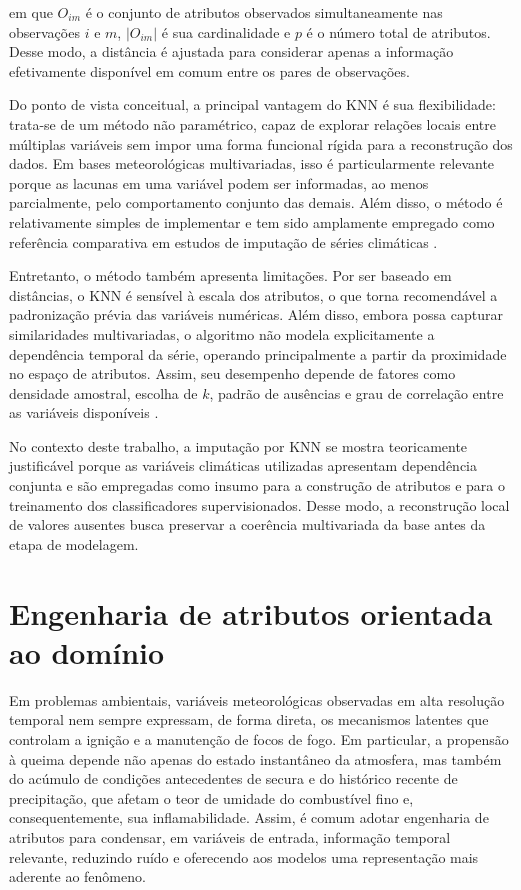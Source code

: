 em que $O_{im}$ é o conjunto de atributos observados simultaneamente nas observações $i$ e $m$, $|O_{im}|$ é sua cardinalidade e $p$ é o número total de atributos. Desse modo, a distância é ajustada para considerar apenas a informação efetivamente disponível em comum entre os pares de observações.

Do ponto de vista conceitual, a principal vantagem do KNN é sua flexibilidade: trata-se de um método não paramétrico, capaz de explorar relações locais entre múltiplas variáveis sem impor uma forma funcional rígida para a reconstrução dos dados. Em bases meteorológicas multivariadas, isso é particularmente relevante porque as lacunas em uma variável podem ser informadas, ao menos parcialmente, pelo comportamento conjunto das demais. Além disso, o método é relativamente simples de implementar e tem sido amplamente empregado como referência comparativa em estudos de imputação de séries climáticas \cite{alejosanchez2025review,troyanskaya2001missing}.

Entretanto, o método também apresenta limitações. Por ser baseado em distâncias, o KNN é sensível à escala dos atributos, o que torna recomendável a padronização prévia das variáveis numéricas. Além disso, embora possa capturar similaridades multivariadas, o algoritmo não modela explicitamente a dependência temporal da série, operando principalmente a partir da proximidade no espaço de atributos. Assim, seu desempenho depende de fatores como densidade amostral, escolha de $k$, padrão de ausências e grau de correlação entre as variáveis disponíveis \cite{ribeiro2021imputation,alejosanchez2025review}.

No contexto deste trabalho, a imputação por KNN se mostra teoricamente justificável porque as variáveis climáticas utilizadas apresentam dependência conjunta e são empregadas como insumo para a construção de atributos e para o treinamento dos classificadores supervisionados. Desse modo, a reconstrução local de valores ausentes busca preservar a coerência multivariada da base antes da etapa de modelagem.

\section{Engenharia de atributos orientada ao domínio}
\label{sec:feature_engineering_dominio}

Em problemas ambientais, variáveis meteorológicas observadas em alta resolução temporal nem sempre expressam, de forma direta, os mecanismos latentes que controlam a ignição e a manutenção de focos de fogo. Em particular, a propensão à queima depende não apenas do estado instantâneo da atmosfera, mas também do acúmulo de condições antecedentes de secura e do histórico recente de precipitação, que afetam o teor de umidade do combustível fino e, consequentemente, sua inflamabilidade. Assim, é comum adotar engenharia de atributos para condensar, em variáveis de entrada, informação temporal relevante, reduzindo ruído e oferecendo aos modelos uma representação mais aderente ao fenômeno.

